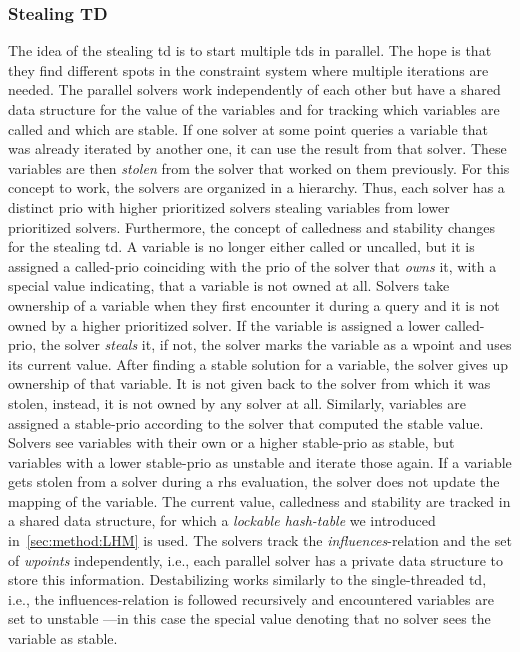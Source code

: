     \subsubsection{Stealing TD}
    \label{sec:method:td_parallel:stealing}
    The idea of the stealing \ac{td} is to start multiple \acp{td} in parallel. The hope is that they find different spots in the constraint system where multiple iterations are needed. The parallel solvers work independently of each other but have a shared data structure for the value of the variables and for tracking which variables are called and which are stable. If one solver at some point queries a variable that was already iterated by another one, it can use the result from that solver. These variables are then \textit{stolen} from the solver that worked on them previously.
    For this concept to work, the solvers are organized in a hierarchy. Thus, each solver has a distinct \ac{prio} with higher prioritized solvers stealing variables from lower prioritized solvers. Furthermore, the concept of calledness and stability changes for the stealing \ac{td}. A variable is no longer either called or uncalled, but it is assigned a called-\ac{prio} coinciding with the \ac{prio} of the solver that \textit{owns} it, with a special value indicating, that a variable is not owned at all. Solvers take ownership of a variable when they first encounter it during a query and it is not owned by a higher prioritized solver. If the variable is assigned a lower called-\ac{prio}, the solver \textit{steals} it, if not, the solver marks the variable as a wpoint and uses its current value.
    After finding a stable solution for a variable, the solver gives up ownership of that variable. It is not given back to the solver from which it was stolen, instead, it is not owned by any solver at all. Similarly, variables are assigned a stable-\ac{prio} according to the solver that computed the stable value. Solvers see variables with their own or a higher stable-\ac{prio} as stable, but variables with a lower stable-\ac{prio} as unstable and iterate those again. If a variable gets stolen from a solver during a \ac{rhs} evaluation, the solver does not update the mapping of the variable.
    The current value, calledness and stability are tracked in a shared data structure, for which a \textit{lockable hash-table} we introduced in~\autoref{sec:method:LHM} is used. The solvers track the \textit{influences}-relation and the set of \textit{wpoints} independently, i.e., each parallel solver has a private data structure to store this information. Destabilizing works similarly to the single-threaded \ac{td}, i.e., the influences-relation is followed recursively and encountered variables are set to unstable ---in this case the special value denoting that no solver sees the variable as stable.

